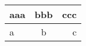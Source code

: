 \begin{tabular}{|l|c|r|}
  \hline 
  aaa & bbb & ccc \\ \hline
  a   & b   & c  \\ \hline
\end{tabular}